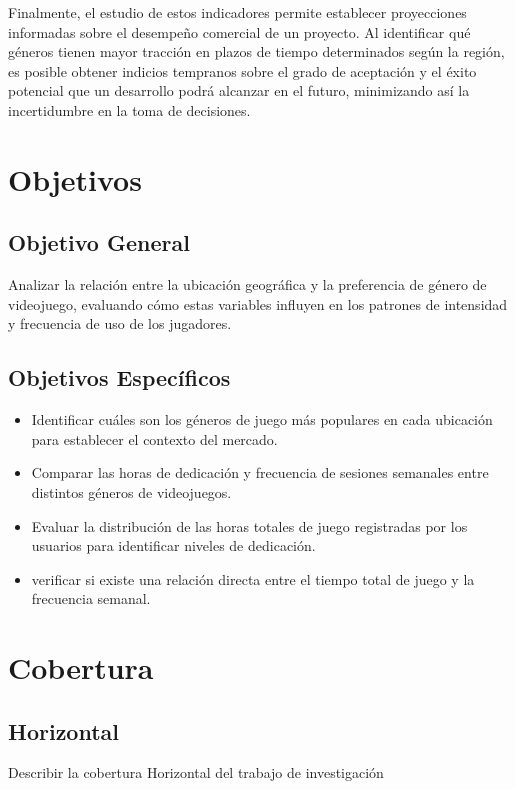 \documentclass[oneside,11pt]{Latex/Classes/PhDthesisPSnPDF}
\begin{document}
Finalmente, el estudio de estos indicadores permite establecer
proyecciones informadas sobre el desempeño comercial de un proyecto. Al
identificar qué géneros tienen mayor tracción en plazos de tiempo
determinados según la región, es posible obtener indicios tempranos
sobre el grado de aceptación y el éxito potencial que un desarrollo
podrá alcanzar en el futuro, minimizando así la incertidumbre en la toma
de decisiones.

\section{Objetivos}

\subsection{Objetivo General}

Analizar la relación entre la ubicación geográfica y la preferencia de
género de videojuego, evaluando cómo estas variables influyen en los
patrones de intensidad y frecuencia de uso de los jugadores.

\subsection{Objetivos Específicos}
\begin{itemize}
  \item{Identificar cuáles son los géneros de juego más populares en cada ubicación para establecer el contexto del mercado.}
  \item{Comparar las horas de dedicación y frecuencia de sesiones semanales entre distintos géneros de videojuegos.}
  \item{Evaluar la distribución de las horas totales de juego registradas por los usuarios para identificar niveles de dedicación.}
  \item{verificar si existe una relación directa entre el tiempo total de juego y la frecuencia semanal.}
\end{itemize}

\section{Cobertura}

\subsection{Horizontal}

Describir la cobertura Horizontal del trabajo de investigación\\
\end{document}
